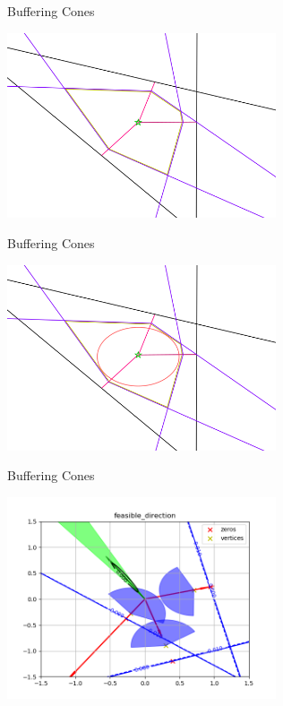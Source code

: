 \documentclass{beamer}
\begin{document}
\begin{frame}{Buffering Cones}
	\begin{center}
		\includegraphics[width=300px]{images/completed_1.png}
	\end{center}
\end{frame}


\begin{frame}{Buffering Cones}
	\begin{center}
		\includegraphics[width=300px]{images/completed_2.png}
	\end{center}
\end{frame}

\begin{frame}{Buffering Cones}
	\begin{center}
		\includegraphics[width=300px]{images/feasible_direction.png}
	\end{center}
\end{frame}
\end{document}
